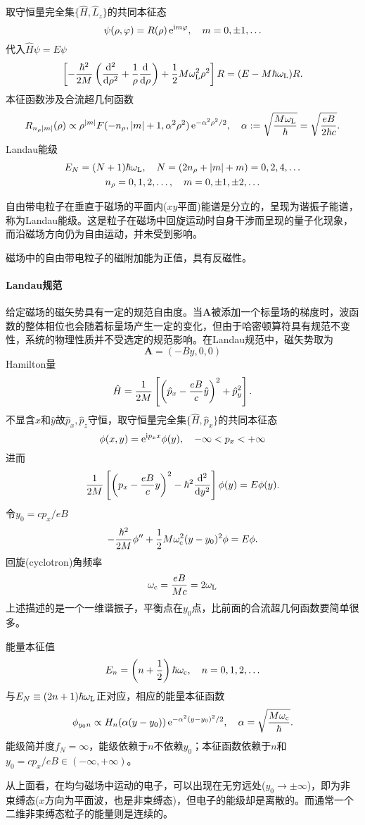 取守恒量完全集$\{\hat H,\hat L_z\}$的共同本征态 %
\[
	\psi(\rho,\vf)=R(\rho)\e{\i m\vf},\quad m=0,\pm 1,\ldots
\]
代入$\hat H\psi=E\psi$
\[
	\fkh{-\frac{\hbar^2}{2M}\kh{\dd[2]\rho+\frac1\rho\dd\rho}+\frac12M\omega_\Larmor^2\rho^2}R=(E-M\hbar\omega_\Larmor)R.
\]
本征函数涉及合流超几何函数
\[
R_{n_\rho\abs m}(\rho)\propto\rho^{\abs m}F(-n_\rho,\abs m+1,\alpha^2\rho^2)\e{-\alpha^2\rho^2/2},\quad \alpha:=\sqrt{\frac{M\omega_\Larmor}\hbar}=\sqrt{\frac{eB}{2\hbar  c}}.
\]
Landau能级
\begin{gather*}
	E_N=(N+1)\hbar\omega_\Larmor,\quad N=(2n_\rho+\abs m+m)=0,2,4,\ldots\\
	n_\rho=0,1,2,\ldots,\quad m=0,\pm 1,\pm 2,\ldots
\end{gather*}

自由带电粒子在垂直于磁场的平面内($xy$平面)能谱是分立的，呈现为谐振子能谱，称为Landau能级。这是粒子在磁场中回旋运动时自身干涉而呈现的量子化现象，而沿磁场方向仍为自由运动，并未受到影响。

磁场中的自由带电粒子的磁附加能为正值，具有反磁性。
\paragraph*{Landau规范}给定磁场的磁矢势具有一定的规范自由度。当$\bm A$被添加一个标量场的梯度时，波函数的整体相位也会随着标量场产生一定的变化，但由于哈密顿算符具有规范不变性，系统的物理性质并不受选定的规范影响。在Landau规范中，磁矢势取为
\[
	\bm A=(-By,0,0)
\]
Hamilton量
\[
	\hat H=\frac1{2M}\fkh{\kh{\hat p_x-\frac{eB}c\hat y}^2+\hat p_y^2}.
\]
不显含$\hat x$和$\hat y$故$\hat p_x,\hat p_z$守恒，取守恒量完全集$\{\hat H,\hat p_x\}$的共同本征态
\[
	\phi(x,y)=\e{\i p_xx}\phi(y),\quad-\infty<p_x<+\infty
\]
进而
\[
	\frac1{2M}\fkh{\kh{p_x-\frac{eB}cy}^2-\hbar^2\dd[2]y}\phi(y)=E\phi(y).
\]
令$y_0=cp_x/eB$
\[
	-\frac{\hbar^2}{2M}\phi''+\frac12M\omega_\cyc^2(y-y_0)^2\phi=E\phi.
\]
回旋(cyclotron)角频率
\[
	\omega_\cyc=\frac{eB}{Mc}=2\omega_\Larmor
\]
上述描述的是一个一维谐振子，平衡点在$y_0$点，比前面的合流超几何函数要简单很多。

能量本征值
\[
E_n=\kh{n+\frac12}\hbar\omega_\cyc,\quad n=0,1,2,\ldots
\]
与$E_N\equiv(2n+1)\hbar\omega_\Larmor$正对应，相应的能量本征函数
\[
	\phi_{y_0n}\propto H_n(\alpha(y-y_0))\e{-\alpha^2(y-y_0)^2/2},\quad\alpha=\sqrt{\frac{M\omega_\cyc}\hbar}.
\]
能级简并度$f_N=\infty$，能级依赖于$n$不依赖$y_0$；本征函数依赖于$n$和$y_0=cp_x/eB\in(-\infty,+\infty)$。

从上面看，在均匀磁场中运动的电子，可以出现在无穷远处($y_0\to\pm\infty$)，即为非束缚态($x$方向为平面波，也是非束缚态)，但电子的能级却是离散的。而通常一个二维非束缚态粒子的能量则是连续的。
